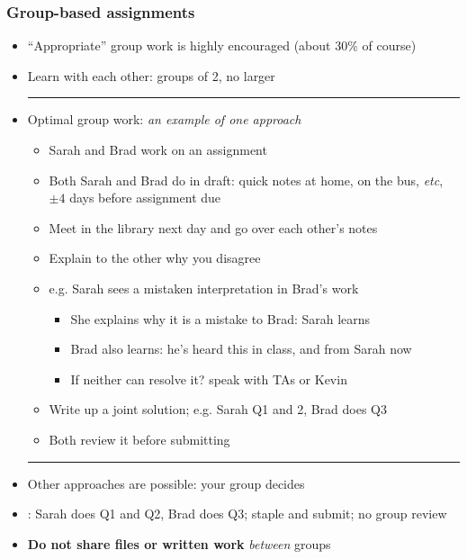 \begin{frame}\frametitle{Group-based assignments}
	\begin{itemize}
		\item	``Appropriate'' group work is highly encouraged (about 30\% of course)
		\item	Learn with each other: groups of 2, no larger
		\vspace{2pt}\hrule\vspace{2pt}
		\item	Optimal group work: \emph{an example of one approach}
			\begin{itemize}
				\item	Sarah and Brad work on an assignment
				\item	Both Sarah and Brad do {} in draft: quick notes at home, on the bus, \emph{etc}, $\pm 4$ days before assignment due
				\pause
				\item	Meet in the library next day and go over each other's notes
				\item	Explain to the other why you disagree
				\item	e.g. Sarah sees a mistaken interpretation in Brad's work
				\begin{itemize}
					\item	She explains why it is a mistake to Brad: Sarah learns
					\item	Brad also learns: he's heard this in class, and from Sarah now
					\item	If neither can resolve it? speak with TAs or Kevin
				\end{itemize}
				\pause
				\item	Write up a joint solution; e.g. Sarah Q1 and 2, Brad does Q3
				\item	Both review it before submitting
			\end{itemize}
		\vspace{2pt}\hrule\vspace{2pt}
		\pause		
		\item	Other approaches are possible: your group decides
		\item	\color{myOrange}{What doesn't work}: Sarah does Q1 and Q2, Brad does Q3; staple and submit; no group review
		\item	\textbf{Do not share files or written work} \emph{between} groups 
	\end{itemize}
\end{frame}

